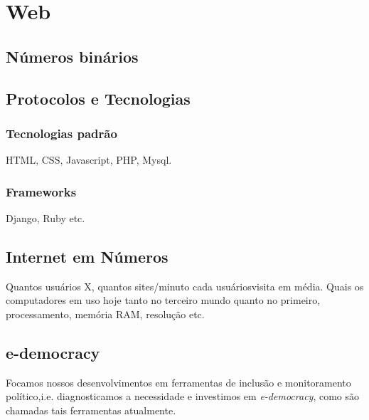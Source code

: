 \section{Web}

\subsection{Números binários}

\subsection{Protocolos e Tecnologias}

\subsubsection{Tecnologias padrão}
HTML, CSS, Javascript, PHP, Mysql.

\subsubsection{Frameworks}
Django, Ruby etc.

\subsection{Internet em Números}

Quantos usuários X, quantos sites/minuto cada usuáriosvisita em média.
Quais os computadores em uso hoje tanto no terceiro mundo quanto no primeiro,
processamento, memória RAM, resolução etc.

\subsection{e-democracy}

Focamos nossos desenvolvimentos em ferramentas de inclusão
e monitoramento político,i.e. diagnosticamos a necessidade
e investimos em \emph{e-democracy}, como são chamadas tais ferramentas atualmente.
